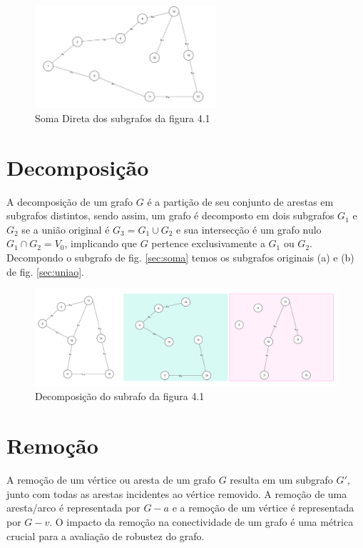 \begin{figure}[!h]
	\centering
	\includegraphics[width=0.6\textwidth]{figuras/subgrafos/subgrafo_soma_direta.png}
	\caption{Soma Direta dos subgrafos da figura 4.1}
	\label{fig:somaDiretaGrafos}
\end{figure}

\section{Decomposição}\label{sec:decomposicao}
A decomposição de um grafo $G$ é a partição de seu conjunto de arestas em subgrafos distintos, sendo assim, um grafo é decomposto em dois subgrafos $G_1$ e $G_2$ se a união original é $G_3 = G_1 \cup G_2$ e sua intersecção é um grafo nulo $G_1 \cap G_2 = V_0$, implicando que $G$ pertence exclusivamente a $G_1$ ou $G_2$. Decompondo o subgrafo de fig. \ref{sec:soma} temos os subgrafos originais (a) e (b) de fig. \ref{sec:uniao}.

\begin{figure}[!h]
	\centering
	\includegraphics[width=1\textwidth]{figuras/decomposicao.png}
	\caption{Decomposição do subrafo da figura 4.1}
	\label{fig:decomposicao}
\end{figure}

\section{Remoção}\label{sec:remocao}
A remoção de um vértice ou aresta de um grafo $G$ resulta em um subgrafo $G'$, junto com todas as arestas incidentes ao vértice removido. A remoção de uma aresta/arco é representada por $G - a$ e a remoção de um vértice é representada por $G - v$. O impacto da remoção na conectividade de um grafo é uma métrica crucial para a avaliação de robustez do grafo.

